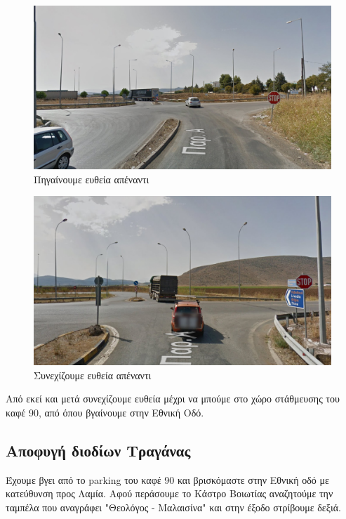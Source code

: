 \begin{figure}[hbp!]
	\centering
		\includegraphics[width=\textwidth]{images/athina-lamia/thiva/thiva3.PNG}
			\caption{Πηγαίνουμε ευθεία απέναντι}
\end{figure}
\begin{figure}[hbp!]
	\centering
		\includegraphics[width=\textwidth]{images/athina-lamia/thiva/thiva4.PNG}
			\caption{Συνεχίζουμε ευθεία απέναντι}
\end{figure}
Από εκεί και μετά συνεχίζουμε ευθεία μέχρι να μπούμε στο χώρο στάθμευσης του καφέ 90, από όπου βγαίνουμε στην Εθνική Οδό.
\newpage
\begin{center}
\section*{Αποφυγή διοδίων Τραγάνας}
\end{center}
Έχουμε βγει από το parking του καφέ 90 και βρισκόμαστε στην Εθνική οδό με κατεύθυνση προς Λαμία. Αφού περάσουμε το Κάστρο Βοιωτίας αναζητούμε την ταμπέλα που αναγράφει "Θεολόγος - Μαλαισίνα" και στην έξοδο στρίβουμε δεξιά.

